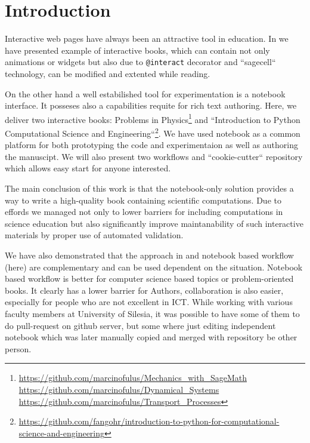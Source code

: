 \documentclass{deliverablereport}
\author{Hans Fangohr, Thomas Kluyver, Marijan Beg, Min
Ragan-Kelley, Vidar Fauske, Marcin Kostur, Jerzy \L{}uczka
 }
\begin{document}
\maketitle
\githubissuedescription
\newpage
\tableofcontents
\newpage


\section{Introduction}

Interactive web pages have always been an attractive tool in
education. In  we have presented example of
interactive books, which can contain not only animations or widgets
but also due to \texttt{@interact} decorator and ``sagecell``
technology, can be modified and extented while reading.

On the other hand a well estabilished tool for experimentation is a
notebook interface. It posseses also a capabilities requite for rich
text authoring. Here, we deliver two interactive books: Problems in
Physics\footnote{\url{https://github.com/marcinofulus/Mechanics_with_SageMath}\\%
\url{https://github.com/marcinofulus/Dynamical_Systems}\\%
\url{https://github.com/marcinofulus/Transport_Processes}}%
%
and ``Introduction to Python Computational Science and
Engineering``\footnote{\url{https://github.com/fangohr/introduction-to-python-for-computational-science-and-engineering}}. We have used \Jupyter notebook as a common platform for
both prototyping the code and experimentaion as well as authoring the
manuscipt. We will also present two workflows and ``cookie-cutter``
repository which allows easy start for anyone interested.


The main conclusion of this work is that the \Jupyter notebook-only
solution provides a way to write a high-quality book containing
scientific computations. Due to \ODK effords we managed not only to
lower barriers for including computations in science education but
also significantly improve maintanability of such interactive
materials by proper use of automated validation.

We have also demonstrated that the approach in
 and notebook based workflow (here) are
complementary and can be used dependent on the situation. Notebook
based workflow is better for computer science based topics or
problem-oriented books. It clearly has a lower barrier for Authors,
collaboration is also easier, especially for people who are not
excellent in ICT. While working with various faculty members at
University of Silesia, it was possible to have some of them to do
pull-request on github server, but some where just editing independent
notebook which was later manually copied and merged with repository be
other person.
\end{document}
